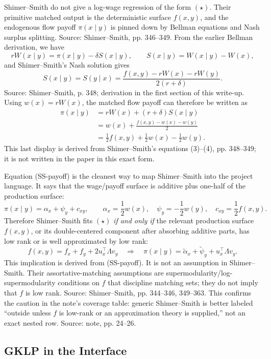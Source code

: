 \documentclass[11pt]{article}
\begin{document}
Shimer--Smith do not give a log-wage regression of the form $(\star)$. Their primitive
matched output is the deterministic surface $f(x,y)$, and the endogenous flow payoff
$\pi(x\mid y)$ is pinned down by Bellman equations and Nash surplus splitting. Source:
Shimer--Smith, pp. 346--349. From the earlier Bellman derivation, we have
\[
rW(x\mid y)=\pi(x\mid y)-\delta S(x\mid y),
\qquad
S(x\mid y)=W(x\mid y)-W(x),
\]
and Shimer--Smith's Nash solution gives
\[
S(x\mid y)=S(y\mid x)
=\frac{f(x,y)-rW(x)-rW(y)}{2(r+\delta)}.
\]
Source: Shimer--Smith, p. 348; derivation in the first section of this write-up.
Using $w(x)=rW(x)$, the matched flow payoff can therefore be written as
\[
\begin{aligned}
\pi(x\mid y)
&=rW(x)+ (r+\delta)S(x\mid y) \\
&=w(x)+\frac{f(x,y)-w(x)-w(y)}{2}\\
&=\frac{1}{2}f(x,y)+\frac{1}{2}w(x)-\frac{1}{2}w(y).
\end{aligned}
\tag{SS-payoff}
\]
This last display is derived from Shimer--Smith's equations (3)--(4), pp. 348--349;
it is not written in the paper in this exact form.

Equation (SS-payoff) is the cleanest way to map Shimer--Smith into the project
language. It says that the wage/payoff surface is additive plus one-half of the
production surface:
\[
\pi(x\mid y)=\alpha_x+\psi_y+c_{xy},
\qquad
\alpha_x=\frac{1}{2}w(x),\quad
\psi_y=-\frac{1}{2}w(y),\quad
c_{xy}=\frac{1}{2}f(x,y).
\]
Therefore Shimer--Smith fits $(\star)$ \emph{if and only if} the relevant production
surface $f(x,y)$, or its double-centered component after absorbing additive parts,
has low rank or is well approximated by low rank:
\[
f(x,y)=f_x+f_y+2u_x^\top\Lambda v_y
\quad\Longrightarrow\quad
\pi(x\mid y)=\tilde\alpha_x+\tilde\psi_y+u_x^\top\Lambda v_y.
\]
This implication is derived from (SS-payoff). It is not an assumption in
Shimer--Smith. Their assortative-matching assumptions are supermodularity/log-
supermodularity conditions on $f$ that discipline matching sets; they do not imply
that $f$ is low rank. Source: Shimer--Smith, pp. 344--346, 349--363. This confirms
the caution in the note's coverage table: generic Shimer--Smith is better labeled
``outside unless $f$ is low-rank or an approximation theory is supplied,'' not an exact
nested row. Source: note, pp. 24--26.

\subsection{GKLP in the Interface}
\end{document}
